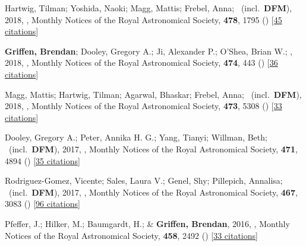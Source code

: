 \item[{\color{numcolor}\scriptsize14}] Hartwig, Tilman; Yoshida, Naoki; Magg, Mattis; Frebel, Anna; \etal\ (incl.\ \textbf{DFM}), 2018, , Monthly Notices of the Royal Astronomical Society, \textbf{478}, 1795 () [\href{https://ui.adsabs.harvard.edu/abs/2018MNRAS.478.1795H}{45 citations}]

\item[{\color{numcolor}\scriptsize13}] \textbf{Griffen, Brendan}; Dooley, Gregory A.; Ji, Alexander P.; O'Shea, Brian W.; \etal, 2018, , Monthly Notices of the Royal Astronomical Society, \textbf{474}, 443 () [\href{https://ui.adsabs.harvard.edu/abs/2018MNRAS.474..443G}{36 citations}]

\item[{\color{numcolor}\scriptsize12}] Magg, Mattis; Hartwig, Tilman; Agarwal, Bhaskar; Frebel, Anna; \etal\ (incl.\ \textbf{DFM}), 2018, , Monthly Notices of the Royal Astronomical Society, \textbf{473}, 5308 () [\href{https://ui.adsabs.harvard.edu/abs/2018MNRAS.473.5308M}{33 citations}]

\item[{\color{numcolor}\scriptsize11}] Dooley, Gregory A.; Peter, Annika H. G.; Yang, Tianyi; Willman, Beth; \etal\ (incl.\ \textbf{DFM}), 2017, , Monthly Notices of the Royal Astronomical Society, \textbf{471}, 4894 () [\href{https://ui.adsabs.harvard.edu/abs/2017MNRAS.471.4894D}{35 citations}]

\item[{\color{numcolor}\scriptsize10}] Rodriguez-Gomez, Vicente; Sales, Laura V.; Genel, Shy; Pillepich, Annalisa; \etal\ (incl.\ \textbf{DFM}), 2017, , Monthly Notices of the Royal Astronomical Society, \textbf{467}, 3083 () [\href{https://ui.adsabs.harvard.edu/abs/2017MNRAS.467.3083R}{96 citations}]

\item[{\color{numcolor}\scriptsize9}] Pfeffer, J.; Hilker, M.; Baumgardt, H.; \& \textbf{Griffen, Brendan}, 2016, , Monthly Notices of the Royal Astronomical Society, \textbf{458}, 2492 () [\href{https://ui.adsabs.harvard.edu/abs/2016MNRAS.458.2492P}{33 citations}]


